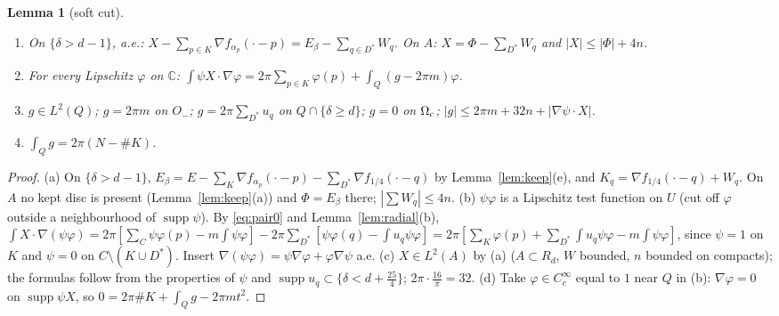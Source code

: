 \documentclass[11pt]{article}
\newtheorem{lemma}[theorem]{Lemma}
\theoremstyle{definition}
\theoremstyle{remark}
\newcommand{\C}{\mathbb C}
\newcommand{\dep}{\delta}
\DeclareMathOperator{\supp}{supp}
\begin{document}
\begin{lemma}[soft cut]\label{lem:soft}
\begin{enumerate}[label=(\alph*)]
\item On $\{\dep>d-1\}$, a.e.: $X-\sum_{p\in K}\nabla f_{\alpha_p}(\cdot-p)=E_\beta-\sum_{q\in D^\ast}W_q$. On $A$: $X=\Phi-\sum_{D^\ast}W_q$ and $|X|\le|\Phi|+4n$.
\item For every Lipschitz $\varphi$ on $\C$: $\int\psi X\cdot\nabla\varphi=2\pi\sum_{p\in K}\varphi(p)+\int_Q(g-2\pi m)\varphi$.
\item $g\in L^2(Q)$; $g=2\pi m$ on $O_-$; $g=2\pi\sum_{D^\ast}u_q$ on $Q\cap\{\dep\ge d\}$; $g=0$ on $\Omega_{\rm c}$;
  $|g|\le2\pi m+32n+|\nabla\psi\cdot X|$.
\item $\int_Qg=2\pi(N-\#K)$.
\end{enumerate}
\end{lemma}
\begin{proof}
(a) On $\{\dep>d-1\}$, $E_\beta=E-\sum_K\nabla f_{\alpha_p}(\cdot-p)-\sum_{D^\ast}\nabla f_{1/4}(\cdot-q)$ by Lemma~\ref{lem:keep}(e), and $K_q=\nabla f_{1/4}(\cdot-q)+W_q$.
On $A$ no kept disc is present (Lemma~\ref{lem:keep}(a)) and $\Phi=E_\beta$ there; $|\sum W_q|\le4n$.
(b) $\psi\varphi$ is a Lipschitz test function on $U$ (cut off $\varphi$ outside a neighbourhood of $\supp\psi$). By \eqref{eq:pair0} and Lemma~\ref{lem:radial}(b),
$\int X\cdot\nabla(\psi\varphi)=2\pi[\sum_C\psi\varphi(p)-m\int\psi\varphi]-2\pi\sum_{D^\ast}[\psi\varphi(q)-\int u_q\psi\varphi]
=2\pi[\sum_K\varphi(p)+\sum_{D^\ast}\int u_q\psi\varphi-m\int\psi\varphi]$, since $\psi=1$ on $K$ and $\psi=0$ on $C\setminus(K\cup D^\ast)$. Insert
$\nabla(\psi\varphi)=\psi\nabla\varphi+\varphi\nabla\psi$ a.e.
(c) $X\in L^2(A)$ by (a) ($A\subset R_d$, $W$ bounded, $n$ bounded on compacts); the formulas follow from the properties of $\psi$ and
$\supp u_q\subset\{\dep<d+\frac{25}4\}$; $2\pi\cdot\frac{16}\pi=32$.
(d) Take $\varphi\in C^\infty_c$ equal to $1$ near $Q$ in (b): $\nabla\varphi=0$ on $\supp\psi X$, so $0=2\pi\#K+\int_Qg-2\pi mt^2$.
\end{proof}
\end{document}
